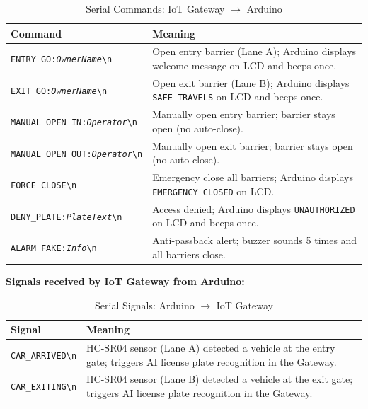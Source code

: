 \documentclass[a4paper]{article}
\begin{document}
\begin{longtable}{@{}
    >{\raggedright\arraybackslash}p{}
    p{} @{}}

    \caption{Serial Commands: IoT Gateway $\rightarrow$ Arduino}
    \label{tab:serial_commands} \\

    \toprule
    \textbf{Command} & \textbf{Meaning} \\
    \midrule
    \endfirsthead

    \bottomrule
    \endlastfoot

    \texttt{ENTRY\_GO:\textit{OwnerName}\textbackslash n} & Open entry barrier (Lane A); Arduino displays welcome message on LCD and beeps once. \\
    \addlinespace
    \texttt{EXIT\_GO:\textit{OwnerName}\textbackslash n} & Open exit barrier (Lane B); Arduino displays \texttt{SAFE TRAVELS} on LCD and beeps once. \\
    \addlinespace
    \texttt{MANUAL\_OPEN\_IN:\textit{Operator}\textbackslash n} & Manually open entry barrier; barrier stays open (no auto-close). \\
    \addlinespace
    \texttt{MANUAL\_OPEN\_OUT:\textit{Operator}\textbackslash n} & Manually open exit barrier; barrier stays open (no auto-close). \\
    \addlinespace
    \texttt{FORCE\_CLOSE\textbackslash n} & Emergency close all barriers; Arduino displays \texttt{EMERGENCY CLOSED} on LCD. \\
    \addlinespace
    \texttt{DENY\_PLATE:\textit{PlateText}\textbackslash n} & Access denied; Arduino displays \texttt{UNAUTHORIZED} on LCD and beeps once. \\
    \addlinespace
    \texttt{ALARM\_FAKE:\textit{Info}\textbackslash n} & Anti-passback alert; buzzer sounds 5 times and all barriers close. \\
\end{longtable}

\vspace{0.5em}
\noindent \textbf{Signals received by IoT Gateway from Arduino:}

\begin{longtable}{@{}
    >{\raggedright\arraybackslash}p{}
    p{} @{}}

    \caption{Serial Signals: Arduino $\rightarrow$ IoT Gateway}
    \label{tab:serial_signals} \\

    \toprule
    \textbf{Signal} & \textbf{Meaning} \\
    \midrule
    \endfirsthead

    \bottomrule
    \endlastfoot

    \texttt{CAR\_ARRIVED\textbackslash n} & HC-SR04 sensor (Lane A) detected a vehicle at the entry gate; triggers AI license plate recognition in the Gateway. \\
    \addlinespace
    \texttt{CAR\_EXITING\textbackslash n} & HC-SR04 sensor (Lane B) detected a vehicle at the exit gate; triggers AI license plate recognition in the Gateway. \\
\end{longtable}
\end{document}
